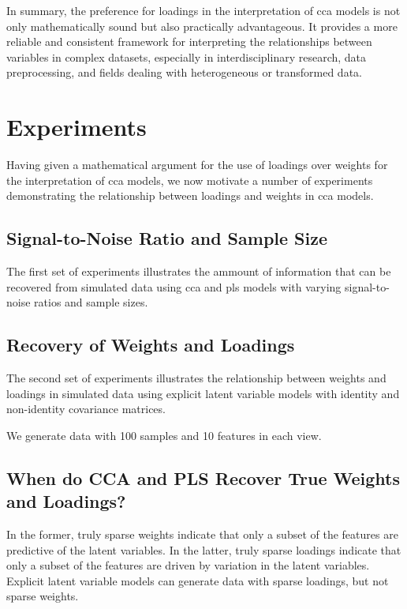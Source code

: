 In summary, the preference for \gls{loadings} in the interpretation of \acrshort{cca} models is not only mathematically sound but also practically advantageous. It provides a more reliable and consistent framework for interpreting the relationships between variables in complex datasets, especially in interdisciplinary research, data preprocessing, and fields dealing with heterogeneous or transformed data.

\section{Experiments}

Having given a mathematical argument for the use of \gls{loadings} over weights for the interpretation of \acrshort{cca} models, we now motivate a number of experiments demonstrating the relationship between loadings and weights in \acrshort{cca} models.

\subsection{Signal-to-Noise Ratio and Sample Size}

The first set of experiments illustrates the ammount of information that can be recovered from simulated data using \acrshort{cca} and \acrshort{pls} models with varying signal-to-noise ratios and sample sizes.

\subsection{Recovery of Weights and Loadings}

The second set of experiments illustrates the relationship between weights and \gls{loadings} in simulated data using explicit latent variable models with identity and non-identity covariance matrices.

We generate data with 100 samples and 10 features in each view.


\subsection{When do CCA and PLS Recover True Weights and Loadings?}

In the former, truly sparse weights indicate that only a subset of the features are predictive of the latent variables.
In the latter, truly sparse \gls{loadings} indicate that only a subset of the features are driven by variation in the latent variables.
Explicit latent variable models can generate data with sparse \gls{loadings}, but not sparse weights.


